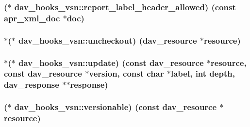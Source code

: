 \subsubsection[{\texorpdfstring{report\+\_\+label\+\_\+header\+\_\+allowed}{report_label_header_allowed}}]{($\ast$ dav\+\_\+hooks\+\_\+vsn\+::report\+\_\+label\+\_\+header\+\_\+allowed) (const {\bf apr\+\_\+xml\+\_\+doc} $\ast${\bf doc})}\hypertarget{structdav__hooks__vsn_aceb9a4be4b4f697bd4f2270779cd4817}{}\label{structdav__hooks__vsn_aceb9a4be4b4f697bd4f2270779cd4817}
\subsubsection[{\texorpdfstring{uncheckout}{uncheckout}}]{$\ast$($\ast$ dav\+\_\+hooks\+\_\+vsn\+::uncheckout) ({\bf dav\+\_\+resource} $\ast${\bf resource})}\hypertarget{structdav__hooks__vsn_af8b0cec623548d4a1d6a488709049b2d}{}\label{structdav__hooks__vsn_af8b0cec623548d4a1d6a488709049b2d}
\subsubsection[{\texorpdfstring{update}{update}}]{$\ast$($\ast$ dav\+\_\+hooks\+\_\+vsn\+::update) (const {\bf dav\+\_\+resource} $\ast${\bf resource}, const {\bf dav\+\_\+resource} $\ast$version, const char $\ast${\bf label}, {\bf int} {\bf depth}, {\bf dav\+\_\+response} $\ast$$\ast${\bf response})}\hypertarget{structdav__hooks__vsn_a53c61f5358c8418a944eeecbc1567e41}{}\label{structdav__hooks__vsn_a53c61f5358c8418a944eeecbc1567e41}
\subsubsection[{\texorpdfstring{versionable}{versionable}}]{($\ast$ dav\+\_\+hooks\+\_\+vsn\+::versionable) (const {\bf dav\+\_\+resource} $\ast${\bf resource})}\hypertarget{structdav__hooks__vsn_a0f752befdafe1d2edba5de6abbbb457c}{}\label{structdav__hooks__vsn_a0f752befdafe1d2edba5de6abbbb457c}
